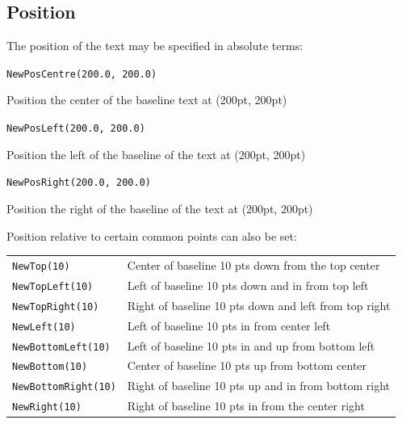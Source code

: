 \documentclass[a4paper]{memoir}
\begin{document}
\subsection{Position}
  The position of the text may be specified in absolute terms:
  \begin{framed}
    \small\verb!NewPosCentre(200.0, 200.0)!
  
    \vspace{2.5mm}
    \noindent Position the center of the baseline text at (200pt, 200pt)

    \vspace{2.5mm}
    \small\verb!NewPosLeft(200.0, 200.0)!
  
    \vspace{2.5mm}
    \noindent Position the left of the baseline of the text at (200pt, 200pt)

    \vspace{2.5mm}
    \small\verb!NewPosRight(200.0, 200.0)!
  
    \vspace{2.5mm}
    \noindent Position the right of the baseline of the text at (200pt, 200pt)

  \end{framed}

  \noindent Position relative to certain common points can also be set:

  \begin{framed}
    \noindent\begin{tabular}{ll}
      \small\verb!NewTop(10)! & Center of baseline 10 pts down from the top center \\
      \small\verb!NewTopLeft(10)! & Left of baseline 10 pts down and in from top left \\
      \small\verb!NewTopRight(10)! & Right of baseline 10 pts down and left from top right\\
      \small\verb!NewLeft(10)! & Left of baseline 10 pts in from center left \\
      \small\verb!NewBottomLeft(10)! & Left of baseline 10 pts in and up from bottom left \\
      \small\verb!NewBottom(10)! & Center of baseline 10 pts up from bottom center\\
      \small\verb!NewBottomRight(10)! & Right of baseline 10 pts up and in from bottom right \\
      \small\verb!NewRight(10)! & Right of baseline 10 pts in from the center right \\
    \end{tabular}
  \end{framed}
\end{document}
